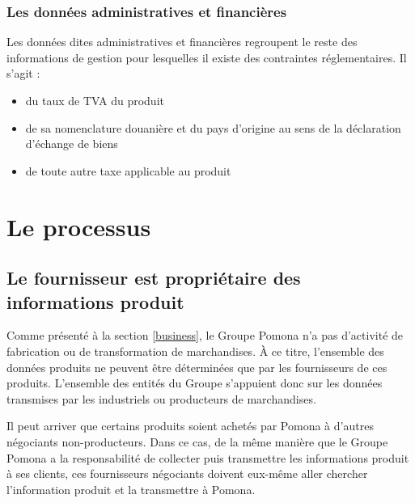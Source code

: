                 \subsubsection{Les données administratives et financières}

                Les données dites administratives et financières regroupent le reste des informations de gestion pour lesquelles il existe des contraintes réglementaires.
                Il s'agit :
                \begin{itemize}
                    \item du taux de TVA du produit
                    \item de sa nomenclature douanière et du pays d'origine au sens de la déclaration d'échange de biens\cite{notions_DEB}
                    \item de toute autre taxe applicable au produit
                \end{itemize}

        \section{Le processus}
        
            \subsection{Le fournisseur est propriétaire des informations produit}

            Comme présenté à la section \ref{business}, le Groupe Pomona n'a pas d'activité de fabrication ou de transformation de marchandises.
            \`{A} ce titre, l'ensemble des données produits ne peuvent être déterminées que par les fournisseurs de ces produits.
            L'ensemble des entités du Groupe s'appuient donc sur les données transmises par les industriels ou producteurs de marchandises.

            Il peut arriver que certains produits soient achetés par Pomona à d'autres négociants non-producteurs.
            Dans ce cas, de la même manière que le Groupe Pomona a la responsabilité de collecter puis transmettre les informations produit à ses clients, ces fournisseurs négociants doivent eux-même aller chercher l'information produit et la transmettre à Pomona.


